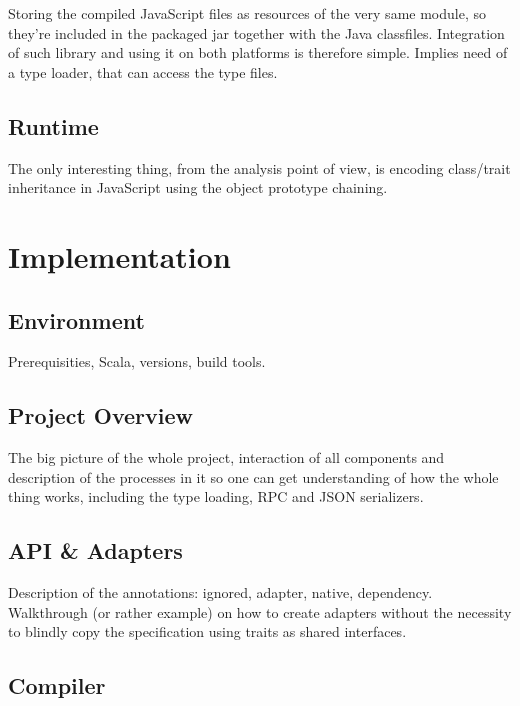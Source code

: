 \documentclass[12pt,a4paper]{report}
\begin{document}
Storing the compiled JavaScript files as resources of the very same module, so they're included in the packaged jar together with the Java classfiles. Integration of such library and using it on both platforms is therefore simple. Implies need of a type loader, that can access the type files.

\section{Runtime}

The only interesting thing, from the analysis point of view, is encoding class/trait inheritance in JavaScript using the object prototype chaining.








\chapter{Implementation}

\section{Environment}

Prerequisities, Scala, versions, build tools.

\section{Project Overview}

The big picture of the whole project, interaction of all components and description of the processes in it so one can get understanding of how the whole thing works, including the type loading, RPC and JSON serializers.

\section{API \& Adapters}

Description of the annotations: ignored, adapter, native, dependency. Walkthrough (or rather example) on how to create adapters without the necessity to blindly copy the specification using traits as shared interfaces.

\section{Compiler}
\end{document}
